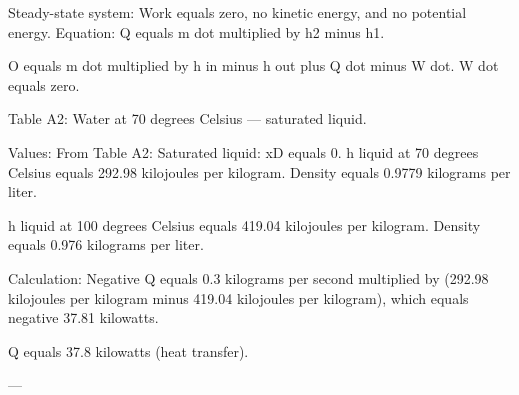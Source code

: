 Steady-state system: Work equals zero, no kinetic energy, and no potential energy.  
Equation:  
Q equals m dot multiplied by h2 minus h1.  

O equals m dot multiplied by h in minus h out plus Q dot minus W dot.  
W dot equals zero.  

Table A2:  
Water at 70 degrees Celsius — saturated liquid.  

Values:  
From Table A2:  
Saturated liquid: xD equals 0.  
h liquid at 70 degrees Celsius equals 292.98 kilojoules per kilogram.  
Density equals 0.9779 kilograms per liter.  

h liquid at 100 degrees Celsius equals 419.04 kilojoules per kilogram.  
Density equals 0.976 kilograms per liter.  

Calculation:  
Negative Q equals 0.3 kilograms per second multiplied by (292.98 kilojoules per kilogram minus 419.04 kilojoules per kilogram), which equals negative 37.81 kilowatts.  

Q equals 37.8 kilowatts (heat transfer).  

---